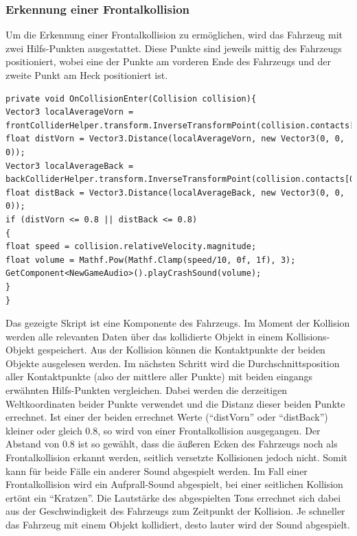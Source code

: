 	\subsubsection{Erkennung einer Frontalkollision}
	Um die Erkennung einer Frontalkollision zu ermöglichen, wird das Fahrzeug mit zwei Hilfs-Punkten ausgestattet. Diese Punkte sind jeweils mittig des Fahrzeugs positioniert, wobei eine der Punkte am vorderen Ende des Fahrzeugs und der zweite Punkt am Heck positioniert ist.
	\begin{lstlisting}
private void OnCollisionEnter(Collision collision){
Vector3 localAverageVorn = frontColliderHelper.transform.InverseTransformPoint(collision.contacts[0].point);
float distVorn = Vector3.Distance(localAverageVorn, new Vector3(0, 0, 0));
Vector3 localAverageBack = backColliderHelper.transform.InverseTransformPoint(collision.contacts[0].point);
float distBack = Vector3.Distance(localAverageBack, new Vector3(0, 0, 0));
if (distVorn <= 0.8 || distBack <= 0.8)
{
float speed = collision.relativeVelocity.magnitude;
float volume = Mathf.Pow(Mathf.Clamp(speed/10, 0f, 1f), 3);
GetComponent<NewGameAudio>().playCrashSound(volume);
}
}
\end{lstlisting}
	Das gezeigte Skript ist eine Komponente des Fahrzeugs. Im Moment der Kollision werden alle relevanten Daten über das kollidierte Objekt in einem Kollisions-Objekt gespeichert. Aus der Kollision können die Kontaktpunkte der beiden Objekte ausgelesen werden. Im nächsten Schritt wird die Durchschnittsposition aller Kontaktpunkte (also der mittlere aller Punkte) mit beiden eingangs erwähnten Hilfs-Punkten vergleichen. Dabei werden die derzeitigen Weltkoordinaten beider Punkte verwendet und die Distanz dieser beiden Punkte errechnet. Ist einer der beiden errechnet Werte (\enquote{distVorn} oder \enquote{distBack}) kleiner oder gleich 0.8, so wird von einer Frontalkollision ausgegangen. Der Abstand von 0.8 ist so gewählt, dass die äußeren Ecken des Fahrzeugs noch als Frontalkollision erkannt werden, seitlich versetzte Kollisionen jedoch nicht. Somit kann für beide Fälle ein anderer Sound abgespielt werden. Im Fall einer Frontalkollision wird ein Aufprall-Sound abgespielt, bei einer seitlichen Kollision ertönt ein \enquote{Kratzen}.
	Die Lautstärke des abgespielten Tons errechnet sich dabei aus der Geschwindigkeit des Fahrzeugs zum Zeitpunkt der Kollision. Je schneller das Fahrzeug mit einem Objekt kollidiert, desto lauter wird der Sound abgespielt.

